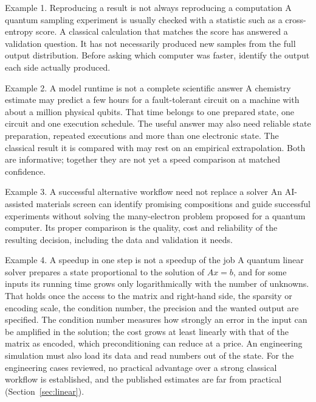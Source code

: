 \begin{exbox}{Example 1. Reproducing a result is not always reproducing a computation}
A quantum sampling experiment is usually checked with a statistic such as a cross-entropy score. A classical calculation that matches the score has answered a validation question. It has not necessarily produced new samples from the full output distribution. Before asking which computer was faster, identify the output each side actually produced.
\end{exbox}
\begin{exbox}{Example 2. A model runtime is not a complete scientific answer}
A chemistry estimate may predict a few hours for a fault-tolerant circuit on a machine with about a million physical qubits. That time belongs to one prepared state, one circuit and one execution schedule. The useful answer may also need reliable state preparation, repeated executions and more than one electronic state. The classical result it is compared with may rest on an empirical extrapolation. Both are informative; together they are not yet a speed comparison at matched confidence.
\end{exbox}
\begin{exbox}{Example 3. A successful alternative workflow need not replace a solver}
An AI-assisted materials screen can identify promising compositions and guide successful experiments without solving the many-electron problem proposed for a quantum computer. Its proper comparison is the quality, cost and reliability of the resulting decision, including the data and validation it needs.
\end{exbox}
\begin{exbox}{Example 4. A speedup in one step is not a speedup of the job}
A quantum linear solver prepares a state proportional to the solution of $Ax=b$, and for some inputs its running time grows only logarithmically with the number of unknowns. That holds once the access to the matrix and right-hand side, the sparsity or encoding scale, the condition number, the precision and the wanted output are specified. The condition number measures how strongly an error in the input can be amplified in the solution; the cost grows at least linearly with that of the matrix as encoded, which preconditioning can reduce at a price. An engineering simulation must also load its data and read numbers out of the state. For the engineering cases reviewed, no practical advantage over a strong classical workflow is established, and the published estimates are far from practical (Section~\ref{sec:linear}).
\end{exbox}

